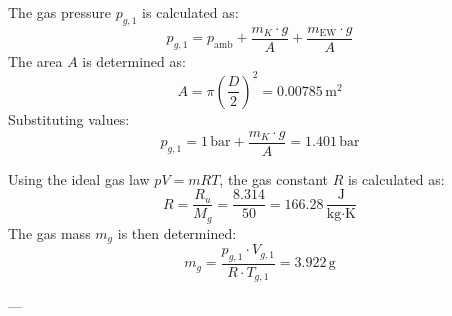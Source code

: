 The gas pressure \( p_{g,1} \) is calculated as:  
\[
p_{g,1} = p_{\text{amb}} + \frac{m_K \cdot g}{A} + \frac{m_{\text{EW}} \cdot g}{A}
\]  
The area \( A \) is determined as:  
\[
A = \pi \left(\frac{D}{2}\right)^2 = 0.00785 \, \text{m}^2
\]  
Substituting values:  
\[
p_{g,1} = 1 \, \text{bar} + \frac{m_K \cdot g}{A} = 1.401 \, \text{bar}
\]  

Using the ideal gas law \( pV = mRT \), the gas constant \( R \) is calculated as:  
\[
R = \frac{R_u}{M_g} = \frac{8.314}{50} = 166.28 \, \frac{\text{J}}{\text{kg·K}}
\]  
The gas mass \( m_g \) is then determined:  
\[
m_g = \frac{p_{g,1} \cdot V_{g,1}}{R \cdot T_{g,1}} = 3.922 \, \text{g}
\]  

---